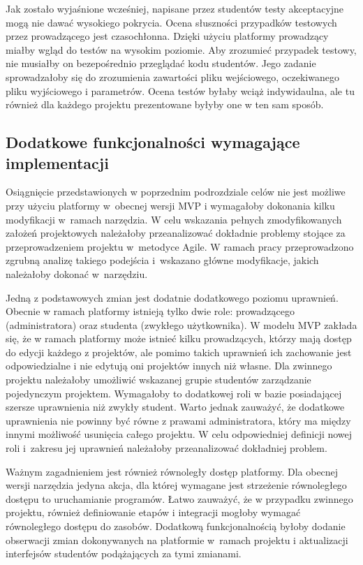Jak zostało wyjaśnione wcześniej, napisane przez studentów testy akceptacyjne mogą nie dawać wysokiego pokrycia.
Ocena słuszności przypadków testowych przez prowadzącego jest czasochłonna.
Dzięki użyciu platformy prowadzący miałby wgląd do testów na wysokim poziomie.
Aby zrozumieć przypadek testowy, nie musiałby on bezepośrednio przeglądać kodu studentów.
Jego zadanie sprowadzałoby się do zrozumienia zawartości pliku wejściowego, oczekiwanego pliku wyjściowego i parametrów.
Ocena testów byłaby wciąż indywidaulna, ale tu również dla każdego projektu prezentowane byłyby one w ten sam sposób.

\subsection{Dodatkowe funkcjonalności wymagające implementacji}
\label{agile_todo}

Osiągnięcie przedstawionych w poprzednim podrozdziale celów nie jest możliwe przy użyciu platformy w~obecnej wersji MVP i wymagałoby dokonania kilku modyfikacji w~ramach narzędzia.
W celu wskazania pełnych zmodyfikowanych założeń projektowych należałoby przeanalizować dokładnie problemy stojące za przeprowadzeniem projektu w~metodyce Agile.
W ramach pracy przeprowadzono zgrubną analizę takiego podejścia i~wskazano główne modyfikacje, jakich należałoby dokonać w~narzędziu.

Jedną z podstawowych zmian jest dodatnie dodatkowego poziomu uprawnień.
Obecnie w ramach platformy istnieją tylko dwie role: prowadzącego (administratora) oraz studenta (zwykłego użytkownika).
W modelu MVP zakłada się, że w ramach platformy może istnieć kilku prowadzących, którzy mają dostęp do edycji każdego z projektów, ale pomimo takich uprawnień ich zachowanie jest odpowiedzialne i nie edytują oni projektów innych niż własne.
Dla zwinnego projektu należałoby umożliwić wskazanej grupie studentów zarządzanie pojedynczym projektem.
Wymagałoby to dodatkowej roli w bazie posiadającej szersze uprawnienia niż zwykły student.
Warto jednak zauważyć, że dodatkowe uprawnienia nie powinny być równe z prawami administratora, który ma między innymi możliwość usunięcia całego projektu.
W celu odpowiedniej definicji nowej roli i~zakresu jej uprawnień należałoby przeanalizować dokładniej problem.

Ważnym zagadnieniem jest również równoległy dostęp platformy.
Dla obecnej wersji narzędzia jedyna akcja, dla której wymagane jest strzeżenie równoległego dostępu to uruchamianie programów.
Łatwo zauważyć, że w przypadku zwinnego projektu, również definiowanie etapów i integracji mogłoby wymagać równoległego dostępu do zasobów.
Dodatkową funkcjonalnością byłoby dodanie obserwacji zmian dokonywanych na platformie w~ramach projektu i aktualizacji interfejsów studentów podążających za tymi zmianami.


